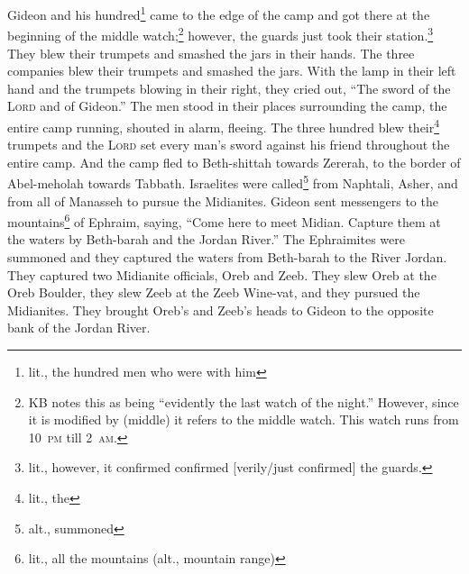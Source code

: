 \begin{inparaenum}
     Gideon and his hundred\footnote{lit., the hundred men who were with him} came to the edge of the camp and got there at the beginning of the middle watch;\footnote{KB notes this as being ``evidently the last watch of the night.'' However, since it is modified by  (middle) it refers to the middle watch. This watch runs from 10~\textsc{pm} till 2~\textsc{am}.} however, the guards just took their station.\footnote{lit., however, it confirmed confirmed [verily/just confirmed] the guards.} They blew their trumpets and smashed the jars in their hands.%
     The three companies blew their trumpets and smashed the jars. With the lamp in their left hand and the trumpets blowing in their right, they cried out, ``The sword of the \textsc{Lord} and of Gideon.''%
     The men stood in their places surrounding the camp, the entire camp running, shouted in alarm, fleeing.%
     The three hundred blew their\footnote{lit., the} trumpets and the \textsc{Lord} set every man's sword against his friend throughout the entire camp. And the camp fled to Beth-shittah towards Zererah, to the border of Abel-meholah towards Tabbath.%
     Israelites were called\footnote{alt., summoned} from Naphtali, Asher, and from all of Manasseh to pursue the Midianites.%
     Gideon sent messengers to the mountains\footnote{lit., all the mountains (alt., mountain range)} of Ephraim, saying, ``Come here to meet Midian. Capture them at the waters by Beth-barah and the Jordan River.'' The Ephraimites were summoned and they captured the waters from Beth-barah to the River Jordan.%
     They captured two Midianite officials, Oreb and Zeeb. They slew Oreb at the Oreb Boulder, they slew Zeeb at the Zeeb Wine-vat, and they pursued the Midianites. They brought Oreb's and Zeeb's heads to Gideon to the opposite bank of the Jordan River.%
\end{inparaenum}
